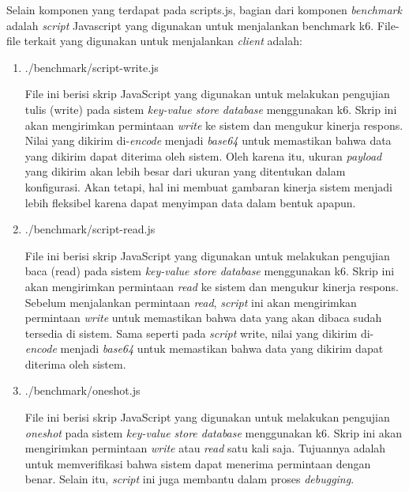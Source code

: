 Selain komponen yang terdapat pada scripts.js, bagian dari komponen \textit{benchmark} adalah \textit{script} Javascript yang digunakan untuk menjalankan benchmark k6. File-file terkait yang digunakan untuk menjalankan \textit{client} adalah:

\begin{enumerate}
  \item ./benchmark/script-write.js

  File ini berisi skrip JavaScript yang digunakan untuk melakukan pengujian tulis (write) pada sistem \textit{key-value store database} menggunakan k6. Skrip ini akan mengirimkan permintaan \textit{write} ke sistem dan mengukur kinerja respons. Nilai yang dikirim di-\textit{encode} menjadi \textit{base64} untuk memastikan bahwa data yang dikirim dapat diterima oleh sistem. Oleh karena itu, ukuran \textit{payload} yang dikirim akan lebih besar dari ukuran yang ditentukan dalam konfigurasi. Akan tetapi, hal ini membuat gambaran kinerja sistem menjadi lebih fleksibel karena dapat menyimpan data dalam bentuk apapun.

  \item ./benchmark/script-read.js
  
  File ini berisi skrip JavaScript yang digunakan untuk melakukan pengujian baca (read) pada sistem \textit{key-value store database} menggunakan k6. Skrip ini akan mengirimkan permintaan \textit{read} ke sistem dan mengukur kinerja respons. Sebelum menjalankan permintaan \textit{read}, \textit{script} ini akan mengirimkan permintaan \textit{write} untuk memastikan bahwa data yang akan dibaca sudah tersedia di sistem. Sama seperti pada \textit{script} write, nilai yang dikirim di-\textit{encode} menjadi \textit{base64} untuk memastikan bahwa data yang dikirim dapat diterima oleh sistem.

  \item ./benchmark/oneshot.js
  
  File ini berisi skrip JavaScript yang digunakan untuk melakukan pengujian \textit{oneshot} pada sistem \textit{key-value store database} menggunakan k6. Skrip ini akan mengirimkan permintaan \textit{write} atau \textit{read} satu kali saja. Tujuannya adalah untuk memverifikasi bahwa sistem dapat menerima permintaan dengan benar. Selain itu, \textit{script} ini juga membantu dalam proses \textit{debugging}.
\end{enumerate}